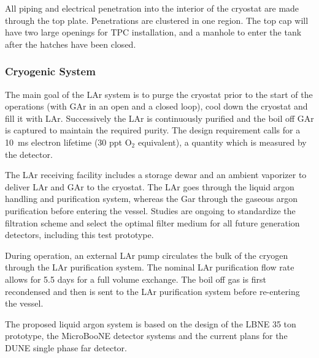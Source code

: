 All piping and electrical penetration into the interior of the
cryostat are made through the top plate.  Penetrations are clustered
in one region.  The top cap will have two large openings for TPC
installation, and a manhole to enter the tank after the hatches have
been closed.

\subsubsection{Cryogenic System}

The main goal of the LAr system is to purge the cryostat prior to the
start of the operations (with GAr in an open and a closed loop), cool
down the cryostat and fill it with LAr. Successively the LAr is
continuously purified and the boil off GAr is captured to maintain the
required purity. The design requirement calls for a 10~ms electron
lifetime (30 ppt O$_2$ equivalent), a quantity which is measured by
the detector.

The LAr receiving facility includes a storage dewar and an ambient
vaporizer to deliver LAr and GAr to the cryostat. The LAr goes through
the liquid argon handling and purification system, whereas the Gar
through the gaseous argon purification before entering the vessel.
Studies are ongoing to standardize the filtration scheme and select
the optimal filter medium for all future generation detectors,
including this test prototype.

During operation, an external LAr pump circulates the bulk of the
cryogen through the LAr purification system. The nominal LAr
purification flow rate allows for 5.5 days for a full volume exchange.
The boil off gas is first recondensed and then is sent to the LAr
purification system before re-entering the vessel.

The proposed liquid argon system is based on the design of the LBNE 35
ton prototype, the MicroBooNE detector systems and the current plans
for the DUNE single phase far detector.








    
    
